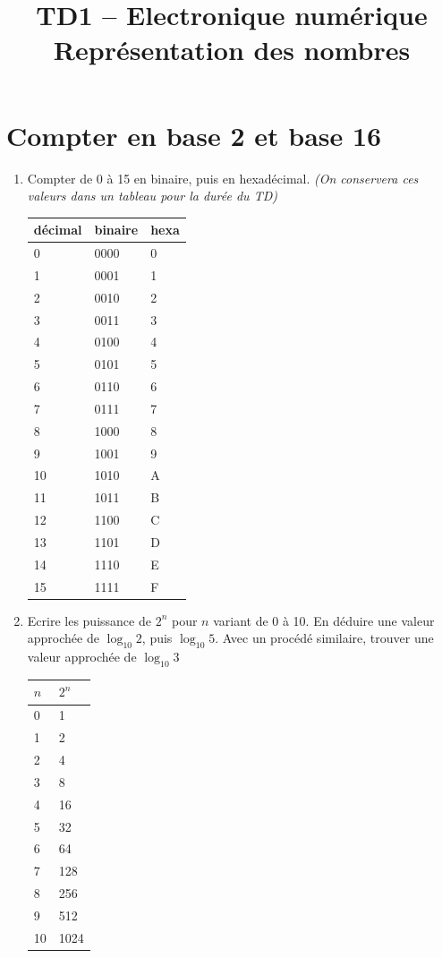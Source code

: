 \documentclass[a4paper,11pt]{article}
\title{{\Huge TD1 -- Electronique numérique}\\Représentation des nombres}
\date{}
\begin{document}
\maketitle

\section{Compter en base 2 et base 16}

\begin{enumerate}
\item{Compter de 0 à 15 en binaire, puis en hexadécimal. {\it (On conservera ces valeurs dans un tableau pour la durée du TD)}}
\begin{center}
  \begin{tabular}{|l|l|l|}
    \hline
    décimal & binaire & hexa \\
    \hline \hline
    0 & 0000 & 0 \\
    1 & 0001 & 1 \\
    2 & 0010 & 2 \\
    3 & 0011 & 3 \\
    4 & 0100 & 4 \\
    5 & 0101 & 5 \\
    6 & 0110 & 6 \\
    7 & 0111 & 7 \\
    8 & 1000 & 8 \\
    9 & 1001 & 9 \\
    10 & 1010 & A \\
    11 & 1011 & B \\
    12 & 1100 & C \\
    13 & 1101 & D \\
    14 & 1110 & E \\
    15 & 1111 & F \\

     \hline
  \end{tabular}
\end{center}

\item{Ecrire les puissance de $2^n$ pour $n$ variant de 0 à 10. En déduire une valeur approchée de $\log_{10} 2$, puis $\log_{10} 5$. Avec un procédé similaire, trouver une valeur approchée de $\log_{10} 3$}
\begin{center}
  \begin{tabular}{|l|l|}
    \hline
    $n$ & $2^n$ \\
    \hline \hline
    0 & 1 \\
    1 & 2 \\
    2 & 4 \\
    3 & 8 \\
    4 & 16 \\
    5 & 32 \\
    6 & 64 \\
    7 & 128 \\
    8 & 256 \\
    9 & 512 \\
    10 & 1024 \\
     \hline
  \end{tabular}
\end{center}


\end{enumerate}
\end{document}

